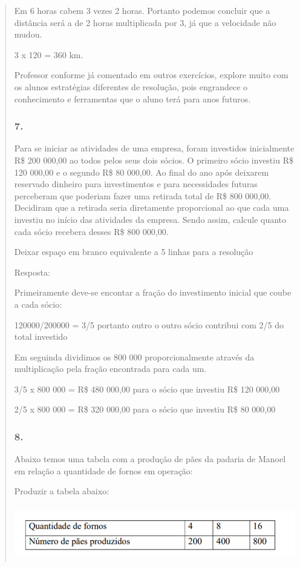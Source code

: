 \begin{enumerate}
\begin{escolha}
\begin{enumerate}
\begin{itemize}
\begin{itemize}
\begin{escolha}
\begin{quote}
\begin{escolha}
{Em 6 horas cabem 3 vezes 2 horas. Portanto podemos concluir que a
distância será a de 2 horas multiplicada por 3, já que a velocidade não
mudou.

3 x 120 = 360 km.

Professor conforme já comentado em outros exercícios, explore muito com
os alunos estratégias diferentes de resolução, pois engrandece o
conhecimento e ferramentas que o aluno terá para anos futuros.

\subsubsection{7.}\label{section-123}

Para se iniciar as atividades de uma empresa, foram investidos
inicialmente R\$ 200 000,00 ao todos pelos seus dois sócios. O primeiro
sócio investiu R\$ 120 000,00 e o segundo R\$ 80 000,00. Ao final do ano
após deixarem reservado dinheiro para investimentos e para necessidades
futuras perceberam que poderiam fazer uma retirada total de R\$ 800
000,00. Decidiram que a retirada seria diretamente proporcional ao que
cada uma investiu no início das atividades da empresa. Sendo assim,
calcule quanto cada sócio recebera desses R\$ 800 000,00.

Deixar espaço em branco equivalente a 5 linhas para a resolução

Resposta:

Primeiramente deve-se encontar a fração do investimento inicial que
coube a cada sócio:

120000/200000 = 3/5 portanto outro o outro sócio contribui com 2/5 do
total investido

Em seguinda dividimos os 800 000 proporcionalmente através da
multiplicação pela fração encontrada para cada um.

3/5 x 800 000 = R\$ 480 000,00 para o sócio que investiu R\$ 120 000,00

2/5 x 800 000 = R\$ 320 000,00 para o sócio que investiu R\$ 80 000,00

\subsubsection{8.}\label{section-124}

Abaixo temos uma tabela com a produção de pães da padaria de Manoel em
relação a quantidade de fornos em operação:

Produzir a tabela abaixo:

\includegraphics[width=5.90556in,height=0.92222in]{media/image131.png}

}
\end{escolha}
\end{quote}
\end{escolha}
\end{itemize}
\end{itemize}
\end{enumerate}
\end{escolha}
\end{enumerate}
